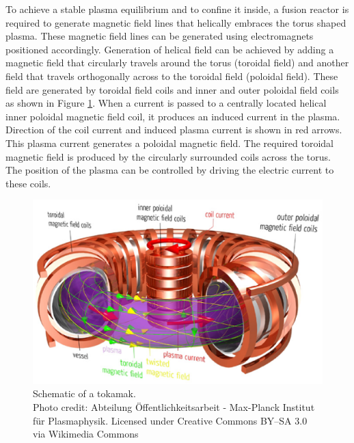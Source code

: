 To achieve a stable plasma equilibrium and to confine it inside, a fusion reactor is required to generate magnetic field lines that helically embraces the torus shaped plasma. These magnetic field lines can be generated using electromagnets positioned accordingly. Generation of helical field can be achieved by adding a magnetic field that circularly travels around the torus (toroidal field) and another field that travels orthogonally across to the toroidal field (poloidal field). These field are generated by toroidal field coils and inner and outer poloidal field coils as shown in Figure \ref{fig:Tokamak}. When a current is passed to a centrally located helical inner poloidal magnetic field coil, it produces an induced current in the plasma. Direction of the coil current and induced plasma current is shown in red arrows. This plasma current generates a poloidal magnetic field. The required toroidal magnetic field is produced by the circularly surrounded coils across the torus. The position of the plasma can be controlled by driving the electric current to these coils. 
\begin{figure}[h!]
	\centering
	\includegraphics[width=0.9\linewidth]{Chapter5/chapter5/Fig1_Tokamak}
	\caption[Schematic of a tokamak]{Schematic of a tokamak. \\\tiny{Photo credit: Abteilung \"{O}ffentlichkeitsarbeit - Max-Planck Institut f\"{u}r Plasmaphysik. Licensed under Creative Commons BY--SA 3.0 via Wikimedia Commons}}
	\label{fig:Tokamak}
\end{figure}

